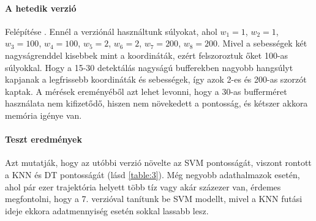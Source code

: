 \documentclass[acmtog, authorversion]{acmart}
\begin{document}
\paragraph{A hetedik verzió} Felépítése \begin{math}[x_0 * w_1, y_0 * w_2, v_{x_0} * w_3, v_{y_0} * w_4, x_l * w_5, y_l * w_6, v_{x_l} * w_7, v_{y_l} * w_8]\end{math}.
Ennél a verziónál használtunk súlyokat, ahol \begin{math}w_1=1\end{math}, \begin{math}w_2=1\end{math}, \begin{math}w_3=100\end{math}, \begin{math}w_4=100\end{math},
\begin{math}w_5=2\end{math}, \begin{math}w_6=2\end{math}, \begin{math}w_7=200\end{math}, \begin{math}w_8=200\end{math}. Mivel a sebességek két 
nagyságrenddel kisebbek mint a koordináták, ezért felszoroztuk őket 100-as súlyokkal. Hogy a 15-30 detektálás nagyságú bufferekben nagyobb hangsúlyt kapjanak a legfrissebb
koordináták és sebességek, így azok 2-es és 200-as szorzót kaptak. A mérések ereményéből azt lehet levonni, hogy a 30-as bufferméret használata nem kifizetődő, hiszen nem növekedett a pontosság, és kétszer akkora memória igénye van.
\paragraph{Teszt eredmények} Azt mutatják, hogy az utóbbi verzió növelte az SVM pontosságát, viszont rontott a KNN és DT pontosságát (lásd \ref{table:3}). Még negyobb adathalmazok esetén, ahol pár ezer trajektória helyett több tíz vagy akár százezer van, érdemes megfontolni, hogy a 7. verzióval tanítunk be SVM modellt, mivel a KNN futási ideje ekkora adatmennyiség esetén sokkal lassabb lesz.
\end{document}

